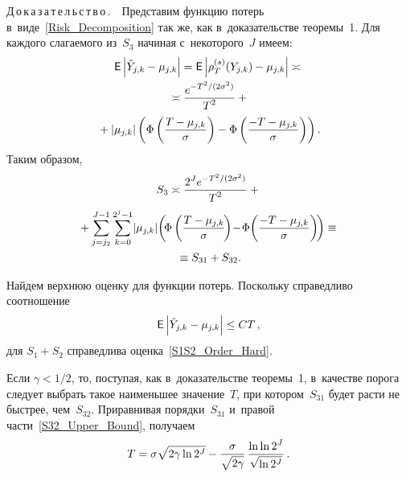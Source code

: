 \begin{multicols}{2}
\noindent
Д\,о\,к\,а\,з\,а\,т\,е\,л\,ь\,с\,т\,в\,о\,.\ \ 
Пред\-ста\-вим функцию потерь в~виде~\eqref{Risk_Decomposition} так же, как в~доказательстве тео\-ре\-мы~1. 
Для каж\-до\-го сла\-га\-емо\-го из~$S_3$ начиная с~некоторого~$J$ имеем:
\begin{multline*}
{\sf E}\left|\hat{Y}_{j,k}-\mu_{j,k}\right|={\sf E}\left|\rho_{T}^{(s)}(Y_{j,k})-\mu_{j,k}\right|\asymp{}\\
{}\asymp
\displaystyle\frac{\displaystyle e^{-{T^2}/({2\sigma^2})}\mathstrut}{\displaystyle T^2\mathstrut}+{}\\
{}+|\mu_{j,k}|\left(\Phi\left(
\displaystyle\frac{\displaystyle T-\mu_{j,k}\mathstrut}{\displaystyle \sigma\mathstrut}\right)-
\Phi\left(\displaystyle\frac{\displaystyle -T-\mu_{j,k}\mathstrut}{\displaystyle \sigma\mathstrut}\right)\right).
\end{multline*}
Таким образом, 
\begin{multline*}
S_3\asymp\fr{2^{J}e^{-{T^2}/({2\sigma^2})}}{T^2}+{}
\\
{}+\sum\limits_{j=j_2}^{J-1}\sum\limits_{k=0}^{2^j-1}\! \left\vert\mu_{j,k}\right\vert\!
\left(\! \Phi\left(\fr{T-\mu_{j,k}}{\sigma}\!\right)\!-\!\Phi\!\left(
\fr{-T-\mu_{j,k}}{\sigma}\right)\!\right)\equiv{}\\
{}\equiv S_{31}+S_{32}.
\end{multline*}

Найдем верх\-нюю оценку для функ\-ции потерь. Поскольку справедливо соотношение
\begin{equation}
\label{Term_Bound_Soft}
{\sf E}\left|\hat{Y}_{j,k}-\mu_{j,k}\right|\leq CT\,,
\end{equation}
для $S_1+S_2$ справедлива оценка~\eqref{S1S2_Order_Hard}.

Если $\gamma<1/2$, то, поступая, как в~доказательстве тео\-ре\-мы~1, 
в~качестве порога следует вы\-брать такое наименьшее значение~$T$, при котором~$S_{31}$ 
будет рас\-ти не быст\-рее, чем~$S_{32}$. Приравнивая порядки~$S_{31}$ и~правой час\-ти~\eqref{S32_Upper_Bound}, 
получаем
$$
T=\sigma\sqrt{2\gamma\ln2^J}-\displaystyle\frac{\displaystyle \sigma\mathstrut}{\displaystyle \sqrt{2\gamma}\mathstrut}\,\displaystyle\frac{\displaystyle \ln{\ln2^J}\mathstrut}{\displaystyle \sqrt{\ln2^J}\mathstrut}\,.
$$


\end{multicols}
